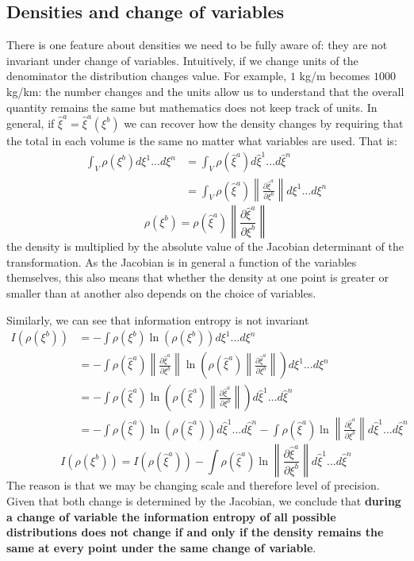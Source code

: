 \documentclass[11pt]{article}
\begin{document}
\subsection*{Densities and change of variables}

There is one feature about densities we need to be fully aware of: they are not invariant under change of variables. Intuitively, if we change units of the denominator the distribution changes value. For example, $1$ kg/m becomes $1000$ kg/km: the number changes and the units allow us to understand that the overall quantity remains the same but mathematics does not keep track of units. In general, if $\hat{\xi}^a=\hat{\xi}^a(\xi^b)$ we can recover how the density changes by requiring that the total in each volume is the same no matter what variables are used. That is:
\begin{align*}
\int_V \rho(\xi^b) d\xi^1 ... d\xi^n &= \int_V \rho(\hat{\xi}^a) d\hat{\xi}^1 ... d\hat{\xi}^n \\
&=\int_V\rho(\hat{\xi}^a) \left\|\frac{\partial \hat{\xi}^a}{\partial \xi^b}\right\| d\xi^1 ... d\xi^n
\end{align*}
\begin{equation}\label{density_transformation}
\rho(\xi^b) = \rho(\hat{\xi}^a) \left\|\frac{\partial \hat{\xi}^a}{\partial \xi^b}\right\|
\end{equation}
the density is multiplied by the absolute value of the Jacobian determinant of the transformation. As the Jacobian is in general a function of the variables themselves, this also means that whether the density at one point is greater or smaller than at another also depends on the choice of variables.

Similarly, we can see that information entropy is not invariant
\begin{align*}
I(\rho(\xi^b)) &=-\int \rho(\xi^b) \ln (\rho(\xi^b)) d\xi^1 ... d\xi^n \\
&=-\int \rho(\hat{\xi}^a) \left\|\frac{\partial \hat{\xi}^a}{\partial \xi^b}\right\| \ln \left(\rho(\hat{\xi}^a) \left\|\frac{\partial \hat{\xi}^a}{\partial \xi^b}\right\|\right) d\xi^1 ... d\xi^n \\
&=-\int \rho(\hat{\xi}^a) \ln \left(\rho(\hat{\xi}^a) \left\|\frac{\partial \hat{\xi}^a}{\partial \xi^b}\right\|\right) d\hat{\xi}^1 ... d\hat{\xi}^n \\
&=-\int \rho(\hat{\xi}^a) \ln (\rho(\hat{\xi}^a)) d\hat{\xi}^1 ... d\hat{\xi}^n -\int \rho(\hat{\xi}^a) \ln \left\|\frac{\partial \hat{\xi}^a}{\partial \xi^b}\right\| d\hat{\xi}^1 ... d\hat{\xi}^n
\end{align*}
\begin{equation}\label{entropy_transformation}
I(\rho(\xi^b)) =I(\rho(\hat{\xi}^a)) -\int \rho(\hat{\xi}^a) \ln \left\|\frac{\partial \hat{\xi}^a}{\partial \xi^b}\right\| d\hat{\xi}^1 ... d\hat{\xi}^n
\end{equation}
The reason is that we may be changing scale and therefore level of precision. Given that both change is determined by the Jacobian, we conclude that \textbf{during a change of variable the information entropy of all possible distributions does not change if and only if the density remains the same at every point under the same change of variable}.
\end{document}
